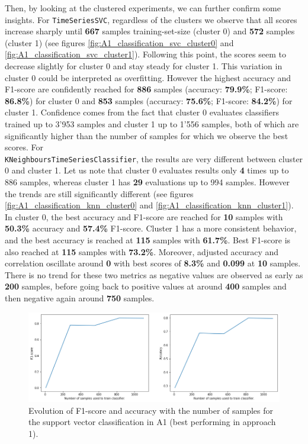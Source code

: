 \documentclass[sigplan,screen]{acmart}
\begin{document}
Then, by looking at the clustered experiments, we can further confirm some insights.
For \texttt{TimeSeriesSVC}, regardless of the clusters we observe that all scores increase sharply until \textbf{667} samples training-set-size (cluster 0) and \textbf{572} samples (cluster 1) (see figures \ref{fig:A1_classification_svc_cluster0} and \ref{fig:A1_classification_svc_cluster1}). Following this point, the scores seem to decrease slightly for cluster 0 and stay steady for cluster 1. This variation in cluster 0 could be interpreted as overfitting. However the highest accuracy and F1-score are confidently reached for \textbf{886} samples (accuracy: \textbf{79.9\%}; F1-score: \textbf{86.8\%}) for cluster 0 and \textbf{853} samples (accuracy: \textbf{75.6\%}; F1-score: \textbf{84.2\%}) for cluster 1. Confidence comes from the fact that cluster 0 evaluates classifiers trained up to 3’953 samples and cluster 1 up to 1’556 samples, both of which are significantly higher than the number of samples for which we observe the best scores.
For \\ \texttt{KNeighboursTimeSeriesClassifier}, the results are very different between cluster 0 and cluster 1. Let us note that cluster 0 evaluates results only \textbf{4} times up to 886 samples, whereas cluster 1 has \textbf{29} evaluations up to 994 samples. However the trends are still significantly different (see figures \ref{fig:A1_classification_knn_cluster0} and \ref{fig:A1_classification_knn_cluster1}). 
In cluster 0, the best accuracy and F1-score are reached for \textbf{10} samples with \textbf{50.3\%} accuracy and \textbf{57.4\%} F1-score.
Cluster 1 has a more consistent behavior, and the best accuracy is reached at \textbf{115} samples with \textbf{61.7\%}. Best F1-score is also reached at \textbf{115} samples with \textbf{73.2\%}. Moreover, adjusted accuracy and correlation oscillate around \textbf{0} with best scores of \textbf{8.3\%} and \textbf{0.099} at \textbf{10} samples. There is no trend for these two metrics as negative values are observed as early as \textbf{200} samples, before going back to positive values at around \textbf{400} samples and then negative again around \textbf{750} samples.

\begin{figure}[h]
    \centering
    \includegraphics[width=\linewidth]{reports/figures/A1_classification_svc_nocluster.png}
    \caption{Evolution of F1-score and accuracy with the number of samples for the support vector classification in A1 (best performing in approach 1).}
    \label{fig:A1_classification_svc_noscluter}
\end{figure}
\end{document}
